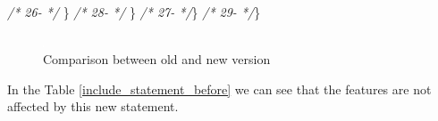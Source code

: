 \documentclass[
]{article}
\newenvironment{Shaded}{\begin{snugshade}}{\end{snugshade}}
\newcommand{\CommentTok}[1]{\textcolor[rgb]{0.56,0.35,0.01}{\textit{#1}}}
\newcommand{\NormalTok}[1]{#1}
\begin{document}
\begin{landscape}
\begin{Shaded}
\begin{Highlighting}[]
\CommentTok{/* 26-                 */}\NormalTok{     \}                                                         }\CommentTok{/* 28-                 */}\NormalTok{     \}                                                         }
\CommentTok{/* 27-                 */}\NormalTok{\}                                                              }\CommentTok{/* 29-                 */}\NormalTok{\}                                                              }
\end{Highlighting}
\end{Shaded}

\normalsize

\begin{figure}
\centering
\includegraphics{figures/fake.png}
\caption{Comparison between old and new version
\label{comparison_include_statement_before}}
\end{figure}

\end{landscape}

\newpage

In the Table \ref{include_statement_before} we can see that the features
are not affected by this new statement.

\small
\end{document}
